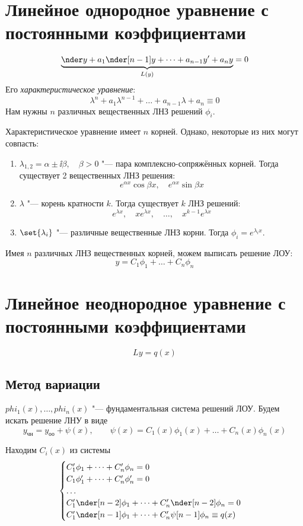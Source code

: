 \section{Линейное однородное уравнение с постоянными коэффициентами}

$$ \underbrace{\nder y + a_1 \nder[n - 1]y + \dots + a_{n - 1}y' + a_n y}_{L(y)} = 0 $$
Его \emph{характеристическое уравнение}:
$$ \lambda^n + a_1 \lambda^{n - 1} + \dots + a_{n - 1}\lambda + a_n \equiv 0 $$
Нам нужны $ n $ различных вещественных ЛНЗ решений $ \phi_i $.

Характеристическое уравнение имеет $ n $ корней.
Однако, некоторые из них могут совпасть:
\begin{enumerate}
	\item $ \lambda_{1,2} = \alpha \pm \ii \beta, \quad \beta > 0 $ "--- пара комплексно-сопряжённых корней.
		Тогда существует 2 вещественных ЛНЗ решения:
		$$ e^{\alpha x}\cos \beta x, \quad e^{\alpha x}\sin \beta x $$

	\item $ \lambda $ "--- корень кратности $ k $.
		Тогда существует $ k $ ЛНЗ решений:
		$$ e^{\lambda x}, \quad x e^{\lambda x}, \quad \dots, \quad x^{k - 1}e^{\lambda x} $$

	\item $ \set{\lambda_i} $ "--- различные вещественные ЛНЗ корни.
		Тогда $ \phi_i = e^{\lambda_i x} $.
\end{enumerate}

Имея $ n $ различных ЛНЗ вещественных корней, можем выписать решение ЛОУ:
$$ y = C_1 \phi_1 + \dots + C_n \phi_n $$

\section{Линейное неоднородное уравнение с постоянными коэффициентами}

$$ Ly = q(x) $$

\subsection*{Метод вариации}

$ phi_1(x), \dots, phi_n(x) $ "--- фундаментальная система решений ЛОУ.
Будем искать решение ЛНУ в виде
$$ y_{\text{чн}} = y_{\text{оо}} + \psi(x), \qquad \psi(x) = C_1(x) \phi_1(x) + \dots + C_n(x) \phi_n(x) $$

Находим $ C_i(x) $ из системы
$$
\begin{cases}
	C_1' \phi_1 + \dots + C_n'\phi_n = 0 \\
	C_1 \phi_1' + \dots + C_n' \phi_n' = 0 \\
	\dots \\
	C_1' \nder[n - 2]\phi_1 + \dots + C_n' \nder[n - 2]\phi_n = 0 \\
	C_1' \nder[n - 1]\phi_1 + \dots + C_n' \psi[n - 1]\phi_n \equiv q(x)
\end{cases} $$

